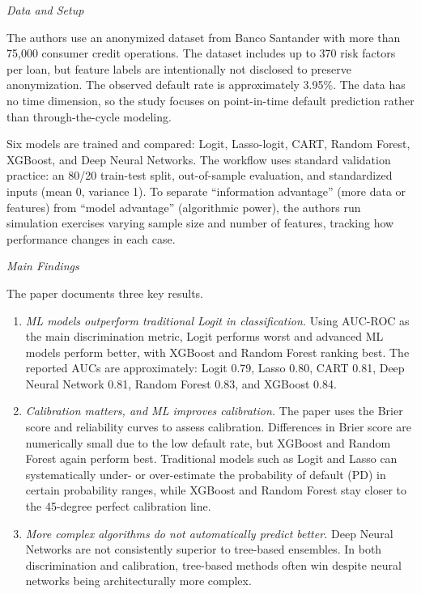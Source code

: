 \documentclass[letterpaper]{article}
\begin{document}
	\medskip
	
	\textit{Data and Setup}
	
	The authors use an anonymized dataset from Banco Santander with more than 75,000 consumer credit operations. The dataset includes up to 370 risk factors per loan, but feature labels are intentionally not disclosed to preserve anonymization. The observed default rate is approximately 3.95\%. The data has no time dimension, so the study focuses on point-in-time default prediction rather than through-the-cycle modeling.
	
	Six models are trained and compared: Logit, Lasso-logit, CART, Random Forest, XGBoost, and Deep Neural Networks. The workflow uses standard validation practice: an 80/20 train-test split, out-of-sample evaluation, and standardized inputs (mean 0, variance 1). To separate ``information advantage'' (more data or features) from ``model advantage'' (algorithmic power), the authors run simulation exercises varying sample size and number of features, tracking how performance changes in each case.
	
	\medskip
	
	\textit{Main Findings}
	
	The paper documents three key results.
	\begin{enumerate}
		\item \textit{ML models outperform traditional Logit in classification.} Using AUC-ROC as the main discrimination metric, Logit performs worst and advanced ML models perform better, with XGBoost and Random Forest ranking best. The reported AUCs are approximately: Logit 0.79, Lasso 0.80, CART 0.81, Deep Neural Network 0.81, Random Forest 0.83, and XGBoost 0.84.
		\item \textit{Calibration matters, and ML improves calibration.} The paper uses the Brier score and reliability curves to assess calibration. Differences in Brier score are numerically small due to the low default rate, but XGBoost and Random Forest again perform best. Traditional models such as Logit and Lasso can systematically under- or over-estimate the probability of default (PD) in certain probability ranges, while XGBoost and Random Forest stay closer to the 45-degree perfect calibration line.
		\item \textit{More complex algorithms do not automatically predict better.} Deep Neural Networks are not consistently superior to tree-based ensembles. In both discrimination and calibration, tree-based methods often win despite neural networks being architecturally more complex.
	\end{enumerate}
	
\end{document}
